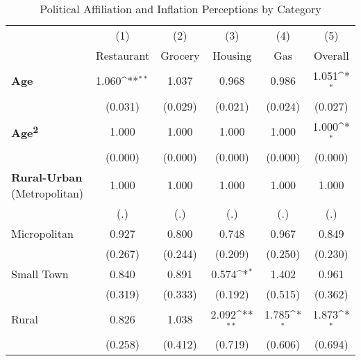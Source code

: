 \begin{table}[htbp]\centering
\def\sym#1{\ifmmode^{#1}\else\(^{#1}\)\fi}
\caption{Political Affiliation and Inflation Perceptions by Category}
\begin{tabular}{l*{5}{c}}
\hline\hline
                    &\multicolumn{1}{c}{(1)}&\multicolumn{1}{c}{(2)}&\multicolumn{1}{c}{(3)}&\multicolumn{1}{c}{(4)}&\multicolumn{1}{c}{(5)}\\
                    &\multicolumn{1}{c}{Restaurant}&\multicolumn{1}{c}{Grocery}&\multicolumn{1}{c}{Housing}&\multicolumn{1}{c}{Gas}&\multicolumn{1}{c}{Overall}\\
\hline
\textbf{Age}        &       1.060\sym{**} &       1.037         &       0.968         &       0.986         &       1.051\sym{*}  \\
                    &     (0.031)         &     (0.029)         &     (0.021)         &     (0.024)         &     (0.027)         \\
\textbf{Age\textsuperscript{2}}&       1.000         &       1.000         &       1.000         &       1.000         &       1.000\sym{*}  \\
                    &     (0.000)         &     (0.000)         &     (0.000)         &     (0.000)         &     (0.000)         \\
\textbf{Rural-Urban} (Metropolitan)&       1.000         &       1.000         &       1.000         &       1.000         &       1.000         \\
                    &         (.)         &         (.)         &         (.)         &         (.)         &         (.)         \\
Micropolitan        &       0.927         &       0.800         &       0.748         &       0.967         &       0.849         \\
                    &     (0.267)         &     (0.244)         &     (0.209)         &     (0.250)         &     (0.230)         \\
Small Town          &       0.840         &       0.891         &       0.574\sym{*}  &       1.402         &       0.961         \\
                    &     (0.319)         &     (0.333)         &     (0.192)         &     (0.515)         &     (0.362)         \\
Rural               &       0.826         &       1.038         &       2.092\sym{**} &       1.785\sym{*}  &       1.873\sym{*}  \\
                    &     (0.258)         &     (0.412)         &     (0.719)         &     (0.606)         &     (0.694)         \\

\end{tabular}
\end{table}
